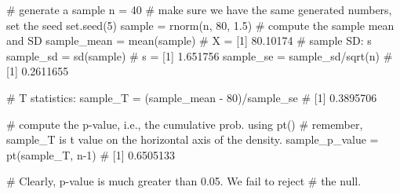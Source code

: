 \documentclass[12pt]{article}
\begin{document}
\begin{figure}[H]
\end{figure}









\begin{rc}
 
# generate a sample
n = 40
# make sure we have the same generated numbers, set the seed
set.seed(5)
sample = rnorm(n, 80, 1.5)
# compute the sample mean and SD
sample_mean = mean(sample)			# X = [1] 80.10174
# sample SD: s
sample_sd = sd(sample)				# s = [1] 1.651756
sample_se = sample_sd/sqrt(n)	# [1] 0.2611655

# T statistics:
sample_T = (sample_mean - 80)/sample_se		# [1] 0.3895706

# compute the p-value, i.e., the cumulative prob. using pt()
# remember, sample_T is t value on the horizontal axis of the density.
sample_p_value = pt(sample_T, n-1)		# [1] 0.6505133

# Clearly, p-value is much greater than 0.05. We fail to reject 
# the null.

\end{rc}
\end{document}
